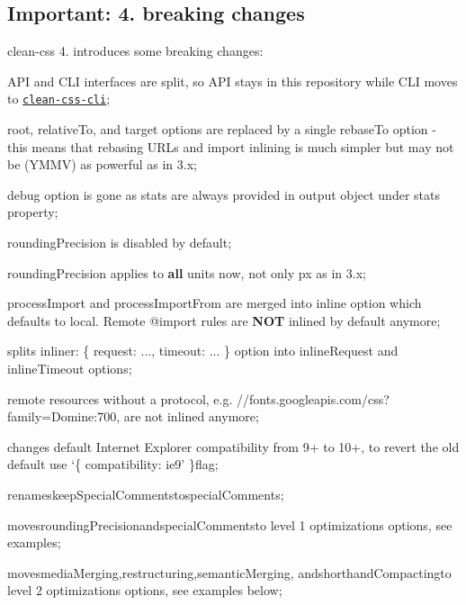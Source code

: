 \subsection*{Important\+: 4. breaking changes}

clean-\/css 4. introduces some breaking changes\+:


\begin{DoxyItemize}
\item A\+PI and C\+LI interfaces are split, so A\+PI stays in this repository while C\+LI moves to \href{https://github.com/jakubpawlowicz/clean-css-cli}{\tt clean-\/css-\/cli};
\item {\ttfamily root}, {\ttfamily relative\+To}, and {\ttfamily target} options are replaced by a single {\ttfamily rebase\+To} option -\/ this means that rebasing U\+R\+Ls and import inlining is much simpler but may not be (Y\+M\+MV) as powerful as in 3.\+x;
\item {\ttfamily debug} option is gone as stats are always provided in output object under {\ttfamily stats} property;
\item {\ttfamily rounding\+Precision} is disabled by default;
\item {\ttfamily rounding\+Precision} applies to {\bfseries all} units now, not only {\ttfamily px} as in 3.\+x;
\item {\ttfamily process\+Import} and {\ttfamily process\+Import\+From} are merged into {\ttfamily inline} option which defaults to {\ttfamily local}. Remote {\ttfamily @import} rules are {\bfseries N\+OT} inlined by default anymore;
\item splits {\ttfamily inliner\+: \{ request\+: ..., timeout\+: ... \}} option into {\ttfamily inline\+Request} and {\ttfamily inline\+Timeout} options;
\item remote resources without a protocol, e.\+g. {\ttfamily //fonts.googleapis.\+com/css?family=Domine\+:700}, are not inlined anymore;
\item changes default Internet Explorer compatibility from 9+ to 10+, to revert the old default use `\{ compatibility\+: \textquotesingle{}ie9' \}{\ttfamily flag;}
\item {\ttfamily renames}keep\+Special\+Comments{\ttfamily to}special\+Comments{\ttfamily ;}
\item {\ttfamily moves}rounding\+Precision{\ttfamily and}special\+Comments{\ttfamily to level 1 optimizations options, see examples;}
\item {\ttfamily moves}media\+Merging{\ttfamily ,}restructuring{\ttfamily ,}semantic\+Merging{\ttfamily , and}shorthand\+Compacting{\ttfamily to level 2 optimizations options, see examples below;}

\end{DoxyItemize}
